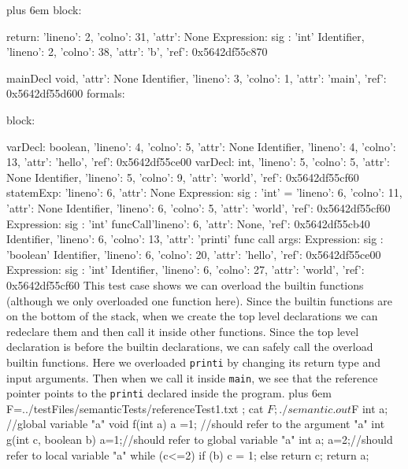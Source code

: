 \documentclass{article}
\makeatletter
\newenvironment{myverb}
 {\def\@xobeysp{\ }\verbatim\rightskip=0pt plus 6em\relax}
 {\endverbatim}
\makeatother
\begin{document}
\begin{itemize}
\begin{myverb}
    block:

      return: {'lineno': 2, 'colno': 31, 'attr': None}
        Expression: {sig : 'int'}
          Identifier, {'lineno': 2, 'colno': 38, 'attr': 'b', 'ref': 0x5642df55c870}

mainDecl
    void, {'attr': None}
    Identifier, {'lineno': 3, 'colno': 1, 'attr': 'main', 'ref': 0x5642df55d600}
      formals:

    block:

      varDecl:
        boolean, {'lineno': 4, 'colno': 5, 'attr': None}
        Identifier, {'lineno': 4, 'colno': 13, 'attr': 'hello', 'ref': 0x5642df55ce00}
      varDecl:
        int, {'lineno': 5, 'colno': 5, 'attr': None}
        Identifier, {'lineno': 5, 'colno': 9, 'attr': 'world', 'ref': 0x5642df55cf60}
      statemExp: {'lineno': 6, 'attr': None}
        Expression: {sig : 'int'}
          = {'lineno': 6, 'colno': 11, 'attr': None}
            Identifier, {'lineno': 6, 'colno': 5, 'attr': 'world', 'ref': 0x5642df55cf60}
            Expression: {sig : 'int'}
              funcCall{'lineno': 6, 'attr': None, 'ref': 0x5642df55cb40}
                Identifier, {'lineno': 6, 'colno': 13, 'attr': 'printi'}
                func call args:
                  Expression: {sig : 'boolean'}
                    Identifier, {'lineno': 6, 'colno': 20, 'attr': 'hello', 'ref': 0x5642df55ce00}
                  Expression: {sig : 'int'}
                    Identifier, {'lineno': 6, 'colno': 27, 'attr': 'world', 'ref': 0x5642df55cf60}
\end{myverb}
This test case shows we can overload the builtin functions (although we only overloaded one function here). Since the builtin functions are on the bottom of the stack, when we create the top level declarations we can redeclare them and then call it inside other functions. Since the top level declaration is before the builtin declarations, we can safely call the overload builtin functions. Here we overloaded \verb|printi| by changing its return type and input arguments. Then when we call it inside \verb|main|, we see that the reference pointer points to the \verb|printi| declared inside the program.
\begin{myverb}
F=../testFiles/semanticTests/referenceTest1.txt ; cat $F; ./semantic.out $F
int a; //global variable "a"
void f(int a){
    a =1; //should refer to the argument "a"
}
int g(int c, boolean b){
    a=1;//should refer to global variable "a"
    int a;
    a=2;//should refer to local variable "a"
    while (c<=2){
        if (b){
            c = 1;
        }
        else{
            return c;
        }
    }
    return a;
}


\end{myverb}
\end{itemize}
\end{document}
